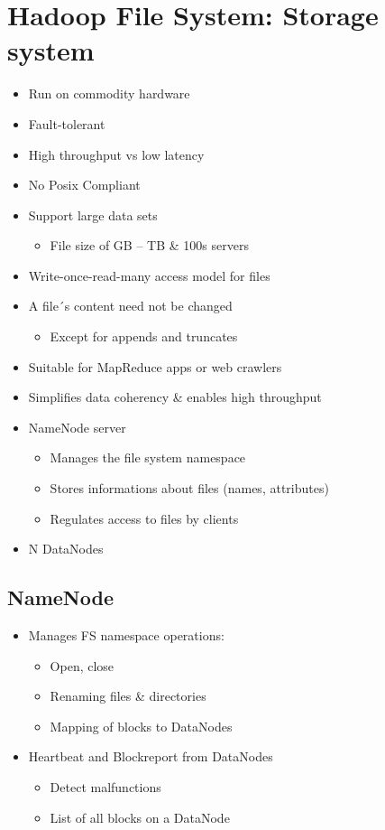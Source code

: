 \section{Hadoop File System: Storage system}
\begin{itemize}
  \item Run on commodity hardware
  \item Fault-tolerant
  \item High throughput vs low latency
  \item No Posix Compliant
  \item Support large data sets
  \begin{itemize}
    \item File size of GB – TB \& 100s servers
  \end{itemize}
  \item Write-once-read-many access model for files
  \item A file´s content need not be changed
  \begin{itemize}
    \item Except for appends and truncates
  \end{itemize}
  \item Suitable for MapReduce apps or web crawlers
  \item Simplifies data coherency \& enables high throughput
\end{itemize}


\begin{itemize}
  \item NameNode server
  \begin{itemize}
    
    \item Manages the file system namespace
    \item Stores informations about files (names, attributes)
    \item Regulates access to files by clients
  \end{itemize}
  \item N DataNodes
\end{itemize}
\subsection{NameNode}
\begin{itemize}
  \item Manages FS namespace operations:
  \begin{itemize}
    \item Open, close
    \item Renaming files \& directories
    \item Mapping of blocks to DataNodes
  \end{itemize}
  \item Heartbeat and Blockreport from DataNodes
  \begin{itemize}
    \item Detect malfunctions
    \item List of all blocks on a DataNode
  \end{itemize}
\end{itemize}

